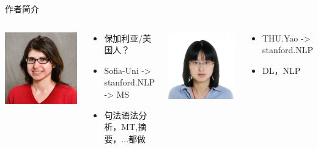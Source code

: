 \documentclass[color=usenames,dvipsnames]{beamer}
\begin{document}
\begin{frame}{作者简介}\footnotesize
  \begin{columns}
   \column{0.3\hsize}
   \begin{center}
     \includegraphics[width=0.65\hsize]{pic/kristina2.jpg}
   \end{center}
     \begin{block}{}
      \begin{itemize}
       \item 保加利亚/美国人？
       \item Sofia-Uni -> stanford.NLP -> MS
       \item 句法语法分析，MT,摘要，...都做
      \end{itemize}
     \end{block}

   \column{0.3\hsize}
   \begin{center}
     \includegraphics[width=0.65\hsize]{pic/danqi2.jpg}
   \end{center}
     \begin{block}{}
      \begin{itemize}
       \item THU.Yao -> stanford.NLP
       \item DL，NLP
      \end{itemize}
     \end{block}
     

\end{columns}
\end{frame}
\end{document}
